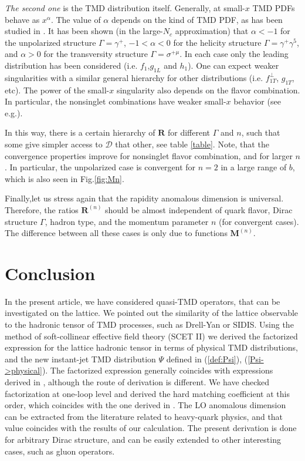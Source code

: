 \documentclass[a4paper, amsfonts, amssymb, amsmath, reprint, showkeys, nofootinbib, twoside]{revtex4-1}
\renewcommand{\(}{\left(}
\renewcommand{\)}{\right)}
\renewcommand{\[}{\left[}
\renewcommand{\]}{\right]}
\begin{document}
\textit{The second one} is the TMD distribution itself. Generally, at small-$x$ TMD PDFs behave as $x^\alpha$. The value of $\alpha$ depends on the kind of TMD PDF, as has been studied in \cite{Kovchegov:2016zex,Kovchegov:2018zeq}. It has been shown (in the large-$N_c$ approximation) that $\alpha<-1$ for the unpolarized structure $\Gamma=\gamma^+$, $-1<\alpha<0$ for the helicity structure $\Gamma=\gamma^+\gamma^5$, and $\alpha>0$ for the transversity structure $\Gamma=\sigma^{+\mu}$. In each case only the leading distribution has been considered (i.e. $f_1$,$g_{1L}$ and $h_1$). One can expect weaker singularities with a similar general hierarchy for other distributions (i.e. $f_{1T}^\perp$, $g_{1T}$, etc). The power of the small-$x$ singularity also depends on the flavor combination. In particular, the nonsinglet combinations have weaker small-$x$ behavior (see e.g.\cite{Kovchegov:2016zex}).


In this way, there is a certain hierarchy of $\mathbf{R}$ for different $\Gamma$ and $n$, such that some give simpler access to $\mathcal{D}$ that other, see table \ref{table}. Note, that the convergence properties improve for nonsinglet flavor combination, and for larger $n$. In particular, the unpolarized case is convergent for $n=2$ in a large range of $b$, which is also seen in Fig.\ref{fig:Mn}.


Finally,let us stress again that the rapidity anomalous dimension is universal. Therefore, the ratios $\mathbf{R}^{(n)}$ should be almost independent of quark flavor, Dirac structure $\Gamma$, hadron type, and the momentum parameter $n$ (for convergent cases). The difference between all these cases is only due to functions $\mathbf{M}^{(n)}$.


\section{Conclusion}

In the present article, we have considered quasi-TMD operators, that can be investigated on the lattice. We pointed out the similarity of the lattice observable to the hadronic tensor of TMD processes, such as Drell-Yan or SIDIS. Using the method of soft-collinear effective field theory (SCET II) we derived the factorized expression for the lattice hadronic tensor in terms of physical TMD distributions, and the new instant-jet TMD distribution $\Psi$ defined in (\ref{def:Psi}), (\ref{Psi->physical}). The factorized expression generally coincides with expressions derived in \cite{Ebert:2019okf,Ji:2019ewn}, although the route of derivation is different. We have checked
factorization 
at one-loop level and derived the hard matching coefficient at this order, which coincides with the one derived in \cite{Ebert:2019okf}. The LO anomalous dimension can be extracted from the literature related to heavy-quark physics, and that value coincides with the results of our calculation. The present derivation is done for arbitrary Dirac structure, and can be easily extended to other interesting cases, such as gluon operators.
\end{document}
